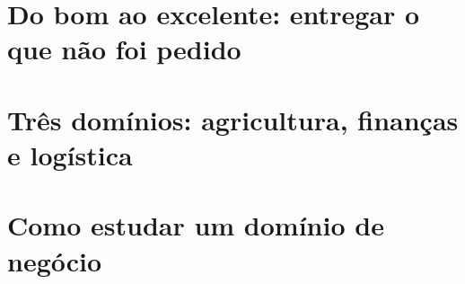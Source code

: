 
\section{Do bom ao excelente: entregar o que não foi pedido}
\label{sec:bom-excelente}


\section{Três domínios: agricultura, finanças e logística}
\label{sec:tres-dominios}


\section{Como estudar um domínio de negócio}
\label{sec:estudar-dominio}

